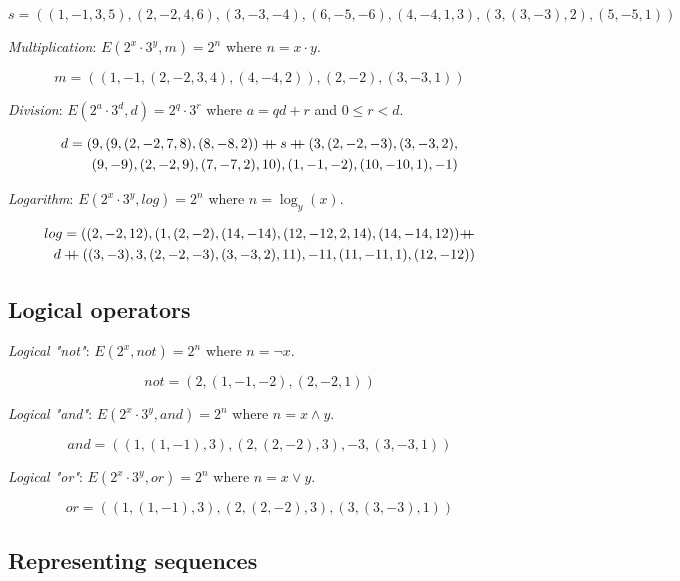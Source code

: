 \documentclass{article}
\newcommand\doubleplus{\mathbin{{+}\mspace{-8mu}{+}}}
\begin{document}
$$s = ((1, -1, 3, 5), (2, -2, 4, 6), (3, -3, -4), (6, -5, -6), (4, -4, 1, 3), (3, (3, -3), 2), (5, -5, 1))$$

\textit{Multiplication}: $E(2^x \cdot 3^y, m) = 2^n$ where $n = x \cdot y$.

$$m = ((1, -1, (2, -2, 3, 4), (4, -4, 2)), (2, -2), (3, -3, 1))$$

\textit{Division}: $E(2^a \cdot 3^d, d) = 2^q \cdot 3^r$ where $a = qd + r$ and $0 \leq r < d$.

\begin{equation*}
\begin{split}
d = (9, (9, (2, -2, 7, 8), (8, -8, 2)) \doubleplus s \doubleplus (3, (2, -2, -3), (3, -3, 2), \\
(9, -9), (2, -2, 9), (7, -7, 2), 10), (1, -1, -2), (10, -10, 1), -1)
\end{split}
\end{equation*}

\textit{Logarithm}: $E(2^x \cdot 3^y, log) = 2^n$ where $n = \log_y(x)$.

\begin{equation*}
\begin{split}
log = ((2, -2, 12), (1, (2, -2), (14, -14), (12, -12, 2, 14), (14, -14, 12)) \doubleplus \\
d \doubleplus ((3, -3), 3, (2, -2, -3), (3, -3, 2), 11), -11, (11, -11, 1), (12, -12))
\end{split}
\end{equation*}

\subsection{Logical operators}

\textit{Logical "not"}: $E(2^x, not) = 2^n$ where $n = \neg x$.

$$not = (2, (1, -1, -2), (2, -2, 1))$$

\textit{Logical "and"}: $E(2^x \cdot 3^y, and) = 2^n$ where $n = x \land y$.

$$and = ((1, (1, -1), 3), (2, (2, -2), 3), -3, (3, -3, 1))$$

\textit{Logical "or"}: $E(2^x \cdot 3^y, or) = 2^n$ where $n = x \lor y$.

$$or = ((1, (1, -1), 3), (2, (2, -2), 3), (3, (3, -3), 1))$$

\subsection{Representing sequences}
\end{document}
